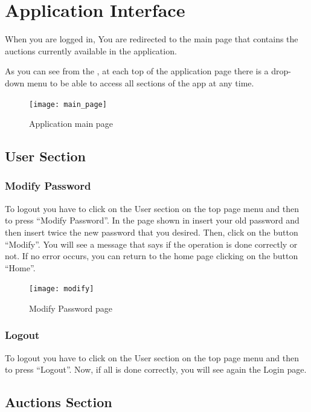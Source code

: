 \section{Application Interface}

When you are logged in, You are redirected to the main page that contains the
auctions currently available in the application.

As you can see from the , at each top of the
application page there is a drop-down menu to be able to access all sections of
the app at any time.


\begin{figure}[H]
	\texttt{[image: main\_page]}
	\caption{Application main page}\label{fig:main_page}
\end{figure}

\subsection{User Section}

\subsubsection{Modify Password}

To logout you have to click on the User section on the top page menu and then to
press ``Modify Password''. In the page shown in  insert your
old password and then insert twice the new password that you desired. Then,
click on the button ``Modify''. You will see a message that says if the
operation is done correctly or not. If no error occurs, you can return to the
home page clicking on the button ``Home''.

\begin{figure}[H]
	\texttt{[image: modify]}
	\caption{Modify Password page}\label{fig:modify}
\end{figure}

\subsubsection{Logout}
To logout you have to click on the User section on the top page menu and then to
press ``Logout''. Now, if all is done correctly, you will see again the Login
page.

\subsection{Auctions Section}

